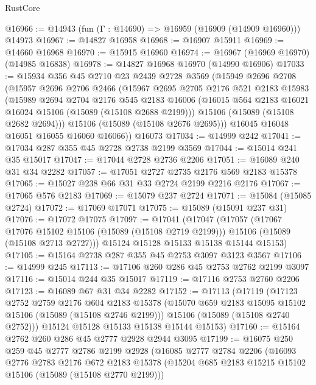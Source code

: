 \begin{lexlean}{RustCore}
\begin{coremodule}
@16966 := @14943 (fun (Γ : @14690) => @16959 (@16909 (@14909 @16960))) @14973
@16967 := @14827 @16958
@16968 := @16907 @15911
@16969 := @14660 @16968
@16970 := @15915 @16960
@16974 := @16967 (@16969 @16970) (@14985 @16838)
@16978 := @14827 @16968 @16970 (@14990 @16906)
@17033 := @15934
    @356
    @45
    @2710
    @23
    @2439
    @2728
    @3569
    (@15949
      @2696
      @2708
      (@15957
        @2696
        @2706
        @2466
        (@15967
          @2695
          @2705
          @2176
          @521
          @2183
          @15983
          (@15989
            @2694
            @2704
            @2176
            @545
            @2183
            @16006
            (@16015 @564 @2183 @16021 @16024 @15106 (@15089 (@15108 @2688 @2199)))
            @15106
            (@15089 (@15108 @2682 @2694)))
          @15106
          (@15089 (@15108 @2676 @2695)))
        @16045
        @16048
        @16051
        @16055
        @16060
        @16066))
    @16073
@17034 := @14999 @242
@17041 := @17034 @287 @355 @45 @2728 @2738 @2199 @3569
@17044 := @15014 @241 @35 @15017
@17047 := @17044 @2728 @2736 @2206
@17051 := @16089 @240 @31 @34 @2282
@17057 := @17051 @2727 @2735 @2176 @569 @2183 @15378
@17065 := @15027 @238 @66 @31 @33 @2724 @2199 @2216 @2176
@17067 := @17065 @576 @2183
@17069 := @15079 @237 @2724
@17071 := @15084 (@15085 @2724)
@17072 := @17069 @17071
@17075 := @15089 (@15091 @237 @31)
@17076 := @17072 @17075
@17097 := @17041
    (@17047
      (@17057
        (@17067 @17076 @15102 @15106 (@15089 (@15108 @2719 @2199)))
        @15106
        (@15089 (@15108 @2713 @2727)))
      @15124
      @15128
      @15133
      @15138
      @15144
      @15153)
@17105 := @15164 @2738 @287 @355 @45 @2753 @3097 @3123 @3567
@17106 := @14999 @245
@17113 := @17106 @260 @286 @45 @2753 @2762 @2199 @3097
@17116 := @15014 @244 @35 @15017
@17119 := @17116 @2753 @2760 @2206
@17123 := @16089 @67 @31 @34 @2282
@17152 := @17113
    (@17119
      (@17123
        @2752
        @2759
        @2176
        @604
        @2183
        @15378
        (@15070 @659 @2183 @15095 @15102 @15106 (@15089 (@15108 @2746 @2199)))
        @15106
        (@15089 (@15108 @2740 @2752)))
      @15124
      @15128
      @15133
      @15138
      @15144
      @15153)
@17160 := @15164 @2762 @260 @286 @45 @2777 @2928 @2944 @3095
@17199 := @16075
    @250
    @259
    @45
    @2777
    @2786
    @2199
    @2928
    (@16085
      @2777
      @2784
      @2206
      (@16093
        @2776
        @2783
        @2176
        @672
        @2183
        @15378
        (@15204 @685 @2183 @15215 @15102 @15106 (@15089 (@15108 @2770 @2199)))

\end{coremodule}
\end{lexlean}
